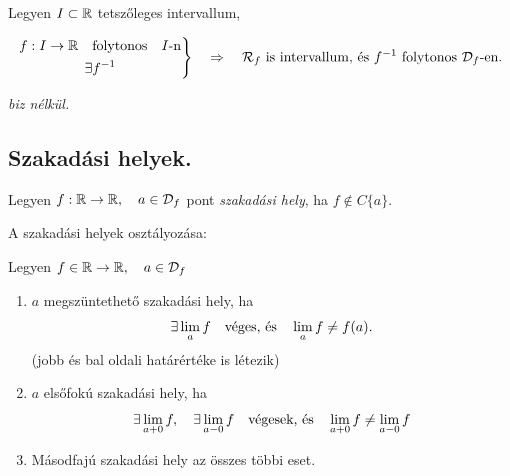 \documentclass[a4paper,11.5pt]{article}
\begin{document}
	\begin{theorem}
		Legyen $I\subset\mathbb{R}$ tetszőleges intervallum,
		
		\[\left.\begin{gathered}
		f:I\to\mathbb{R}\quad \text{folytonos}\quad I\text{-n}\\
		\exists f^{-1}
		\end{gathered}\right\}\quad \Rightarrow\quad \mathcal{R}_f\text{ is intervallum, és }f^{-1}\text{ folytonos }\mathcal{D}_f\text{-en.}\]
		
		\textit{biz nélkül.}
	\end{theorem}
	\subsection{Szakadási helyek.}
	\begin{definition}
		Legyen $f:\mathbb{R}\to\mathbb{R},\quad a\in\mathcal{D}_f$ pont \textit{szakadási hely}, ha $f\notin C\{a\}$. 
	\end{definition}
	
	\begin{definition}
		A szakadási helyek osztályozása:
		
		Legyen $f\in\mathbb{R}\to \mathbb{R}, \quad a\in\mathcal{D}_f$
		\begin{enumerate}
			\item $a$ megszüntethető szakadási hely, ha
				\[ \exists\lim_a f \text{\quad véges, és\quad } \lim_a f\not=f(a). \]
				(jobb és bal oldali határértéke is létezik)
			\item $a$ elsőfokú szakadási hely, ha
				\[ \exists \lim_{a+0} f,\quad \exists\lim_{a-0}f \text{\quad végesek, és\quad } \lim_{a+0} f \not= \lim_{a-0}f \] 
			\item Másodfajú szakadási hely az összes többi eset.
		\end{enumerate}
	\end{definition}
\end{document}

